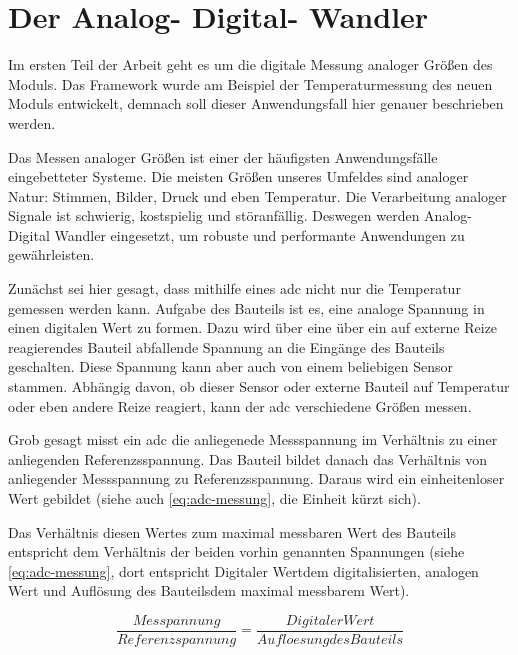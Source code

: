 \thispagestyle{firstPage}

\section{Der Analog- Digital- Wandler}
\label{sec:ad-wandler}

Im ersten Teil der Arbeit geht es um die digitale Messung analoger Größen des Moduls.
Das Framework wurde am Beispiel der Temperaturmessung des neuen Moduls entwickelt, demnach soll dieser Anwendungsfall hier genauer beschrieben werden.

Das Messen analoger Größen ist einer der häufigsten Anwendungsfälle eingebetteter Systeme. 
Die meisten Größen unseres Umfeldes sind analoger Natur: Stimmen, Bilder, Druck und eben Temperatur.
Die Verarbeitung analoger Signale ist schwierig, kostspielig und störanfällig.
Deswegen werden Analog- Digital Wandler eingesetzt, um robuste und performante Anwendungen zu gewährleisten.

Zunächst sei hier gesagt, dass mithilfe eines \ac{adc} nicht nur die Temperatur gemessen werden kann.
Aufgabe des Bauteils ist es, eine analoge Spannung in einen digitalen Wert zu formen.
Dazu wird über eine über ein auf externe Reize reagierendes Bauteil abfallende Spannung an die Eingänge des Bauteils geschalten.
Diese Spannung kann aber auch von einem beliebigen Sensor stammen.
Abhängig davon, ob dieser Sensor oder externe Bauteil auf Temperatur oder eben andere Reize reagiert, kann der \ac{adc} verschiedene Größen messen.

Grob gesagt misst ein \ac{adc} die anliegenede Messspannung im Verhältnis zu einer anliegenden Referenzsspannung.
Das Bauteil bildet danach das Verhältnis von anliegender Messspannung zu Referenzsspannung.
Daraus wird ein einheitenloser Wert gebildet (siehe auch \autoref{eq:adc-messung}, die Einheit kürzt sich).

Das Verhältnis diesen Wertes zum maximal messbaren Wert des Bauteils entspricht dem Verhältnis der beiden vorhin genannten Spannungen (siehe \autoref{eq:adc-messung}, dort entspricht \glqq Digitaler Wert\grqq dem digitalisierten, analogen Wert und \glqq Auflösung des Bauteils\grqq dem maximal messbarem Wert).

\begin{equation}
    \frac{Messpannung}{Referenzspannung} = \frac{Digitaler Wert}{Aufloesung des Bauteils}
    \label{eq:adc-messung}
\end{equation}

